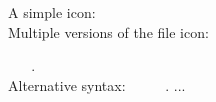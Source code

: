 \documentclass[10pt,]{article}
\begin{document}
A simple icon: \faHandPointUp\\
Multiple versions of the file icon:
\faFile~

\faFile*~ \faFile[regular]~ \faFile*[regular].\\
Alternative syntax: ~ ~ ~ .
...
\end{document}

